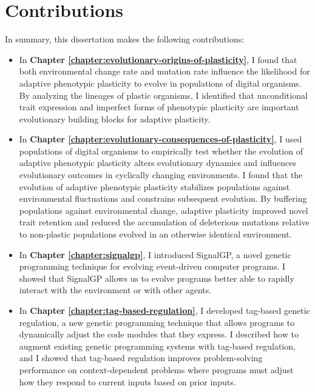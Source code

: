 \section{Contributions}

In summary, this dissertation makes the following contributions:

\begin{itemize}
    
    \item In \textbf{Chapter \ref{chapter:evolutionary-origins-of-plasticity}}, I found that both environmental change rate and mutation rate influence the likelihood for adaptive phenotypic plasticity to evolve in populations of digital organisms. 
    By analyzing the lineages of plastic organisms, I identified that unconditional trait expression and imperfect forms of phenotypic plasticity are important evolutionary building blocks for adaptive plasticity. 
    
    \item In \textbf{Chapter \ref{chapter:evolutionary-consequences-of-plasticity}}, I used populations of digital organisms to empirically test whether the evolution of adaptive phenotypic plasticity alters evolutionary dynamics and influences evolutionary outcomes in cyclically changing environments.
    I found that the evolution of adaptive phenotypic plasticity stabilizes populations against environmental fluctuations and constrains subsequent evolution.
    By buffering populations against environmental change, adaptive plasticity improved novel trait retention and reduced the accumulation of deleterious mutations relative to non-plastic populations evolved in an otherwise identical environment. 
    
    \item In \textbf{Chapter \ref{chapter:signalgp}}, I introduced SignalGP, a novel genetic programming technique for evolving event-driven computer programs. 
    I showed that SignalGP allows us to evolve programs better able to rapidly interact with the environment or with other agents. 
    
    \item In \textbf{Chapter \ref{chapter:tag-based-regulation}}, I developed tag-based genetic regulation, a new genetic programming technique that allows programs to dynamically adjust the code modules that they express.
    I described how to augment existing genetic programming systems with tag-based regulation, and I showed that tag-based regulation improves problem-solving performance on context-dependent problems where programs must adjust how they respond to current inputs based on prior inputs.
    

\end{itemize}
